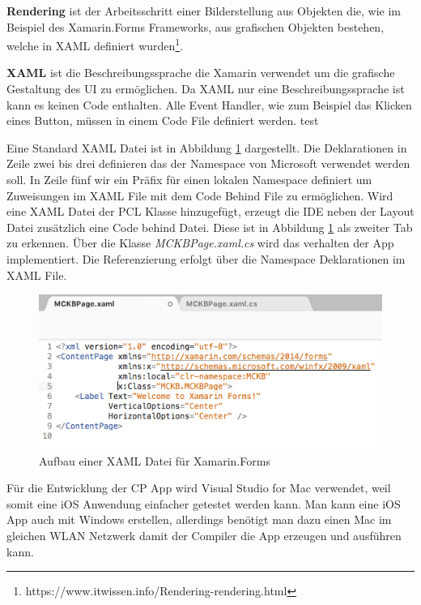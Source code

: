 	\textbf{Rendering} ist der Arbeitsschritt einer Bilderstellung aus Objekten die, wie im Beispiel des Xamarin.Forms Frameworks, aus grafischen Objekten bestehen, welche in XAML definiert wurden\footnote{https://www.itwissen.info/Rendering-rendering.html}.

	\textbf{XAML} ist die Beschreibungssprache die Xamarin verwendet um die grafische Gestaltung des UI zu ermöglichen. Da XAML nur eine Beschreibungssprache ist kann es keinen Code enthalten. Alle Event Handler, wie zum Beispiel das Klicken eines Button, müssen in einem Code File definiert werden.
	test

	\newpage
	Eine Standard XAML Datei ist in Abbildung \ref{fig:xamarinaformxamlpreview} dargestellt. Die Deklarationen in Zeile zwei bis drei definieren das der Namespace von Microsoft verwendet werden soll. In Zeile fünf wir ein Präfix für einen lokalen Namespace definiert um Zuweisungen im XAML File mit dem Code Behind File zu ermöglichen. Wird eine XAML Datei der PCL Klasse hinzugefügt, erzeugt die IDE neben der Layout Datei zusätzlich eine Code behind Datei. Diese ist in Abbildung \ref{fig:xamarinaformxamlpreview} als zweiter Tab zu erkennen. Über die Klasse \textit{MCKBPage.xaml.cs} wird das verhalten der App implementiert. Die Referenzierung erfolgt über die Namespace Deklarationen im XAML File.

	\begin{figure}[h!]
		\centering
		\includegraphics[width=1\textwidth]{images/XAML-preview.png}
		\caption[Aufbau einer XAML Datei für Xamarin.Forms]{Aufbau einer XAML Datei für Xamarin.Forms}
		\label{fig:xamarinaformxamlpreview}
	\end{figure}
	Für die Entwicklung der CP App wird Visual Studio for Mac verwendet, weil somit eine iOS Anwendung einfacher getestet werden kann. Man kann eine iOS App auch mit Windows erstellen, allerdings benötigt man dazu einen Mac im gleichen WLAN Netzwerk damit der Compiler die App erzeugen und ausführen kann.

